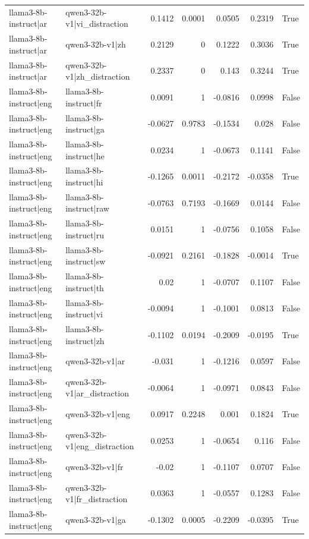 \begin{table}
\begin{tabular}{l l r r r r l}
llama3-8b-instruct|ar & qwen3-32b-v1|vi_distraction & 0.1412 & 0.0001 & 0.0505 & 0.2319 & True \\
llama3-8b-instruct|ar & qwen3-32b-v1|zh & 0.2129 & 0 & 0.1222 & 0.3036 & True \\
llama3-8b-instruct|ar & qwen3-32b-v1|zh_distraction & 0.2337 & 0 & 0.143 & 0.3244 & True \\
llama3-8b-instruct|eng & llama3-8b-instruct|fr & 0.0091 & 1 & -0.0816 & 0.0998 & False \\
llama3-8b-instruct|eng & llama3-8b-instruct|ga & -0.0627 & 0.9783 & -0.1534 & 0.028 & False \\
llama3-8b-instruct|eng & llama3-8b-instruct|he & 0.0234 & 1 & -0.0673 & 0.1141 & False \\
llama3-8b-instruct|eng & llama3-8b-instruct|hi & -0.1265 & 0.0011 & -0.2172 & -0.0358 & True \\
llama3-8b-instruct|eng & llama3-8b-instruct|raw & -0.0763 & 0.7193 & -0.1669 & 0.0144 & False \\
llama3-8b-instruct|eng & llama3-8b-instruct|ru & 0.0151 & 1 & -0.0756 & 0.1058 & False \\
llama3-8b-instruct|eng & llama3-8b-instruct|sw & -0.0921 & 0.2161 & -0.1828 & -0.0014 & True \\
llama3-8b-instruct|eng & llama3-8b-instruct|th & 0.02 & 1 & -0.0707 & 0.1107 & False \\
llama3-8b-instruct|eng & llama3-8b-instruct|vi & -0.0094 & 1 & -0.1001 & 0.0813 & False \\
llama3-8b-instruct|eng & llama3-8b-instruct|zh & -0.1102 & 0.0194 & -0.2009 & -0.0195 & True \\
llama3-8b-instruct|eng & qwen3-32b-v1|ar & -0.031 & 1 & -0.1216 & 0.0597 & False \\
llama3-8b-instruct|eng & qwen3-32b-v1|ar_distraction & -0.0064 & 1 & -0.0971 & 0.0843 & False \\
llama3-8b-instruct|eng & qwen3-32b-v1|eng & 0.0917 & 0.2248 & 0.001 & 0.1824 & True \\
llama3-8b-instruct|eng & qwen3-32b-v1|eng_distraction & 0.0253 & 1 & -0.0654 & 0.116 & False \\
llama3-8b-instruct|eng & qwen3-32b-v1|fr & -0.02 & 1 & -0.1107 & 0.0707 & False \\
llama3-8b-instruct|eng & qwen3-32b-v1|fr_distraction & 0.0363 & 1 & -0.0557 & 0.1283 & False \\
llama3-8b-instruct|eng & qwen3-32b-v1|ga & -0.1302 & 0.0005 & -0.2209 & -0.0395 & True \\

\end{tabular}
\end{table}
